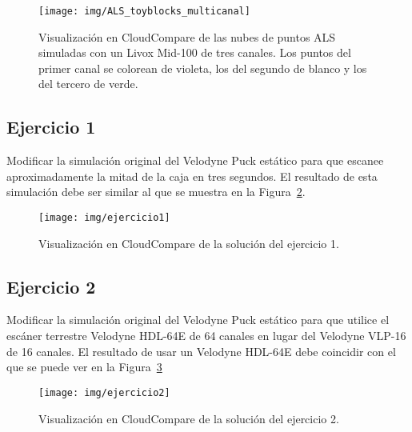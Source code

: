 \documentclass[]{article}
\begin{document}
	
	\begin{figure}[H]
		\centering
		\texttt{[image: img/ALS\_toyblocks\_multicanal]}
		\caption{Visualización en CloudCompare de las nubes de puntos ALS simuladas con un Livox Mid-100 de tres canales. Los puntos del primer canal se colorean de violeta, los del segundo de blanco y los del tercero de verde.}
		\label{fig:als_toyblocks_multicanal}
	\end{figure}




	\pagebreak
	

	\subsection*{Ejercicio 1}
	Modificar la simulación original del Velodyne Puck estático para que escanee aproximadamente la mitad de la caja en tres segundos. El resultado de esta simulación debe ser similar al que se muestra en la Figura~\ref{fig:ejercicio1}.
	
	\begin{figure}[htb]
		\centering
		\texttt{[image: img/ejercicio1]}
		\caption{Visualización en CloudCompare de la solución del ejercicio 1.}
		\label{fig:ejercicio1}
	\end{figure}


	\subsection*{Ejercicio 2}
	Modificar la simulación original del Velodyne Puck estático para que utilice el escáner terrestre Velodyne HDL-64E de 64 canales en lugar del Velodyne VLP-16 de 16 canales. El resultado de usar un Velodyne HDL-64E debe coincidir con el que se puede ver en la Figura~\ref{fig:ejercicio2}
	
	\begin{figure}[htb]
		\centering
		\texttt{[image: img/ejercicio2]}
		\caption{Visualización en CloudCompare de la solución del ejercicio 2.}
		\label{fig:ejercicio2}
	\end{figure}


	\pagebreak
	
\end{document}
